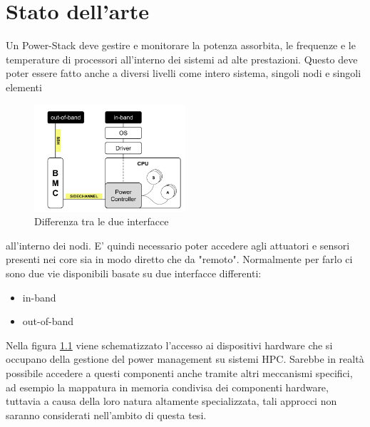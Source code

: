 
\chapter{Stato dell'arte}
Un Power-Stack deve gestire e monitorare la potenza assorbita, le frequenze e le temperature di processori all'interno dei sistemi ad alte prestazioni. Questo deve poter essere fatto anche a diversi livelli come intero sistema, singoli nodi e singoli elementi 
\setlength{\intextsep}{1pt} %
\begin{figure}
    \includegraphics[width=0.5\textwidth]{img/SoA.png}
    \centering
    \caption{Differenza tra le due interfacce} 
    \label{fig:SoAinoutband}
\end{figure}
all'interno dei nodi. E' quindi necessario poter accedere agli attuatori e sensori presenti nei core sia in modo diretto che da "remoto". Normalmente per farlo ci sono due vie disponibili basate su due interfacce differenti:
\begin{itemize}
    \item in-band
    \item out-of-band
\end{itemize}
Nella figura \ref{fig:SoAinoutband} viene schematizzato l'accesso ai dispositivi hardware che si occupano della gestione del power management su sistemi HPC. Sarebbe in realtà possibile accedere a questi componenti anche tramite altri meccanismi specifici, ad esempio la mappatura in memoria condivisa dei componenti hardware, tuttavia a causa della loro natura altamente specializzata, tali approcci non saranno considerati nell'ambito di questa tesi.


